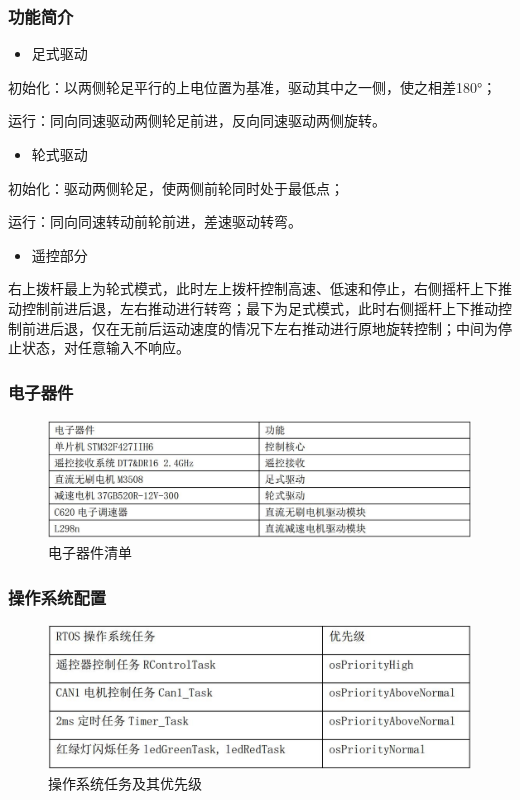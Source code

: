 \documentclass[a4paper, 11pt]{article}   %
\begin{document}
\begin{CJK}{UTF8}{gbsn}
\begin{spacing}{1.15}
\subsubsection{功能简介}
\begin{itemize}
\item 足式驱动
\end{itemize}\par
初始化：以两侧轮足平行的上电位置为基准，驱动其中之一侧，使之相差180°；\par
运行：同向同速驱动两侧轮足前进，反向同速驱动两侧旋转。
\begin{itemize}
\item 轮式驱动
\end{itemize}\par
初始化：驱动两侧轮足，使两侧前轮同时处于最低点；\par
运行：同向同速转动前轮前进，差速驱动转弯。

\begin{itemize}
\item 遥控部分
\end{itemize}\par
右上拨杆最上为轮式模式，此时左上拨杆控制高速、低速和停止，右侧摇杆上下推动控制前进后退，左右推动进行转弯；最下为足式模式，此时右侧摇杆上下推动控制前进后退，仅在无前后运动速度的情况下左右推动进行原地旋转控制；中间为停止状态，对任意输入不响应。
\subsubsection{电子器件}
 \begin{figure}[H]
\centering
\includegraphics[width=.9\textwidth]{chap5//fig2.jpg}
\caption{电子器件清单}
\end{figure}
\subsubsection{操作系统配置}
 \begin{figure}[H]
\centering
\includegraphics[width=.77\textwidth]{chap5//fig3.jpg}
\caption{操作系统任务及其优先级}
\end{figure}


\end{spacing}
\end{CJK}
\end{document}
